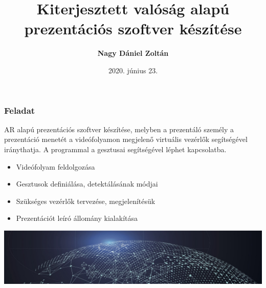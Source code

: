\documentclass{beamer}
\title[Szakdolgozat védés, 2020. június 23.]{\Huge Kiterjesztett valóság alapú prezentációs szoftver készítése}
\author[Nagy Dániel Zoltán]{\textbf{\huge Nagy Dániel Zoltán}}
\institute[]{\Large Miskolci Egyetem}
\date{2020. június 23.}
\begin{document}

\frame{\Large \titlepage}

\begin{frame}[fragile]
\frametitle{Feladat}

AR alapú prezentációs szoftver készítése, melyben a prezentáló személy a prezentáció menetét a videófolyamon megjelenő virtuális vezérlők segítségével iránythatja. A programmal a gesztusai segítségével léphet kapcsolatba.

\medskip
\begin{block}{}
\begin{itemize}
	\item Videófolyam feldolgozása
	\item Gesztusok definiálása, detektálásának módjai
	\item Szükséges vezérlők tervezése, megjelenítésük
	\item Prezentációt leíró állomány kialakítása
\end{itemize}
\end{block}

\medskip

\includegraphics[width=\textwidth]{images/globe.png}

\end{frame}
\end{document}
